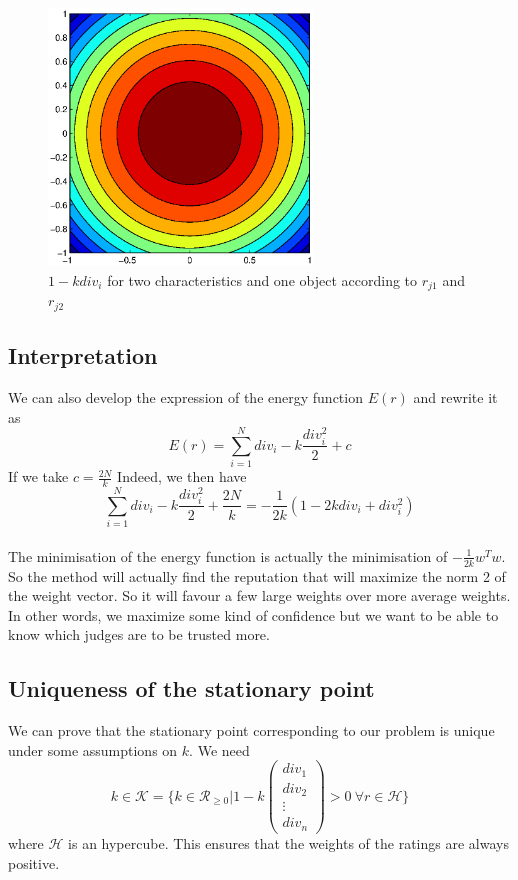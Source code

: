 \documentclass[12pt,a4paper]{article}
\begin{document}
\begin{figure}
\centering
\includegraphics[width = 7cm]{images/courbes.eps}
\caption{$1-k div_i$ for two characteristics and one object according to $r_{j1}$ and $r_{j2}$}
\end{figure}

\subsection{Interpretation}
We can also develop the expression of the energy function $E(r)$ and rewrite it as
$$ E(r) = \sum_{i=1}^N div_i - k \frac{div_i^2}{2} + c$$
If we take $c = \frac{2N}{k}$
Indeed, we then have $$ \sum_{i=1}^N div_i - k \frac{div_i^2}{2} + \frac{2N}{k}= -\frac{1}{2k}(1 - 2kdiv_i + div_i^2)$$
\\
The minimisation of the energy function is actually the minimisation of $  -\frac{1}{2k} w^Tw $.
So the method will actually find the reputation that will maximize the norm 2 of the weight vector. So it will favour a few large weights over more average weights. In other words, we maximize some kind of confidence but we want to be able to know which judges are to be trusted more.


\subsection{Uniqueness of the stationary point}

We can prove that the stationary point corresponding to our problem is unique under some assumptions on $k$.
We need $$k\in \mathcal{K} = \{k\in \mathcal{R}_{\geq 0} | 1 - k \begin{pmatrix} div_1 \\ div_2 \\ \vdots \\ div_n \end{pmatrix} >0 \: \forall r \in \mathcal{H} \}$$
where $\mathcal{H}$ is an hypercube. This ensures that the weights of the ratings are always positive. 
\end{document}
